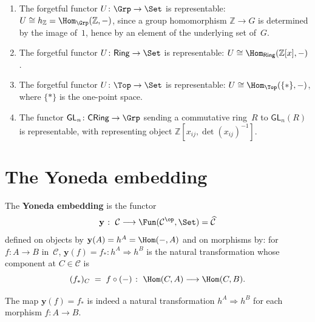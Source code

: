\begin{example}\label{ex:representable-forgetful}
\begin{enumerate}[label=(\roman*)]
\item The forgetful functor $U\colon\Grp\to\Set$ is representable:
    $U\cong h_{\mathbb{Z}} = \Hom_{\Grp}(\mathbb{Z},-)$, since a
    group homomorphism $\mathbb{Z}\to G$ is determined by the image
    of~$1$, hence by an element of the underlying set of~$G$.

\item The forgetful functor $U\colon\mathsf{Ring}\to\Set$ is
    representable: $U\cong\Hom_{\mathsf{Ring}}(\mathbb{Z}[x],-)$.

\item The forgetful functor $U\colon\Top\to\Set$ is representable:
    $U\cong\Hom_{\Top}(\{*\},-)$, where $\{*\}$ is the one-point space.

\item The functor $\mathsf{GL}_n\colon\mathsf{CRing}\to\Grp$ sending
    a commutative ring~$R$ to $\mathsf{GL}_n(R)$ is representable, with
    representing object $\mathbb{Z}[x_{ij},\det(x_{ij})^{-1}]$.
\end{enumerate}
\end{example}


\section{The Yoneda embedding}\label{sec:yoneda-embedding}

\begin{definition}\label{def:yoneda-embedding}
The \textbf{Yoneda embedding} is the functor
\[
    \mathbf{y} \;\colon\; \mathcal{C} \longrightarrow
    \Fun(\mathcal{C}^{\op},\Set) = \widehat{\mathcal{C}}
\]
defined on objects by $\mathbf{y}(A) = h^A = \Hom(-,A)$
and on morphisms by: for $f\colon A\to B$ in~$\mathcal{C}$,
$\mathbf{y}(f) = f_*\colon h^A\Rightarrow h^B$ is the natural transformation
whose component at $C\in\mathcal{C}$ is
\[
    (f_*)_C \;=\; f\circ(-) \;\colon\;
    \Hom(C,A) \longrightarrow \Hom(C,B).
\]
\end{definition}

\begin{lemma}\label{lem:yoneda-well-defined}
The map $\mathbf{y}(f) = f_*$ is indeed a natural transformation
$h^A\Rightarrow h^B$ for each morphism $f\colon A\to B$.
\end{lemma}

